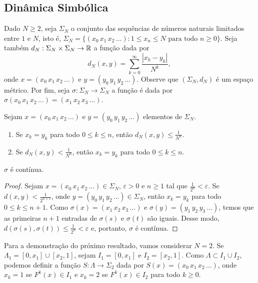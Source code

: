 \subsection{Dinâmica Simbólica}

Dado $N \geq 2$, seja $\Sigma_N$ o conjunto das sequências de números naturais limitados entre $1$ e $N$, isto é, $\Sigma_N = \lbrace (x_0 \, x_1 \, x_2 \, \dots) : 1 \leq x_n \leq N  \text{ para todo } n \geq 0 \rbrace$.
Seja também $d_N : \Sigma_N \times \Sigma_N \to \mathbb{R}$ a função dada por
$$d_N(x, y) = \sum_{k=0}^\infty \frac{|x_k - y_k|}{N^k},$$
onde $x = (x_0 \, x_1 \, x_2 \, \dots)$ e $y = (y_0 \, y_1 \, y_2 \, \dots)$.
Observe que $(\Sigma_N, d_N)$ é um espaço métrico.
Por fim, seja $\sigma: \Sigma_N \to \Sigma_N$ a função é dada por $\sigma(x_0 \, x_1 \, x_2 \, \dots) = (x_1 \, x_2 \, x_3 \, \dots)$.

\begin{proposition}
Sejam $x = (x_0 \, x_1 \, x_2 \, \dots)$ e $y = (y_0 \, y_1 \, y_2 \, \dots)$ elementos de $\Sigma_N$.
\begin{enumerate}
\item Se $x_k = y_k$ para todo $0 \leq k \leq n$, então $d_N(x, y) \leq \frac{1}{N^n}$.
\item Se $d_N(x, y) < \frac{1}{N^n}$, então $x_k = y_k$ para todo $0 \leq k \leq n$.
\end{enumerate}
\end{proposition}

\begin{proposition}
$\sigma$ é contínua.
\end{proposition}

\begin{proof}
Sejam $x = (x_0 \, x_1 \, x_2 \, \dots) \in \Sigma_N$, $\varepsilon > 0$ e $n \geq 1$ tal que $\frac{1}{2^n} < \varepsilon$.
Se $d(x, y) < \frac{1}{2^{n+1}}$, onde $y = (y_0 \, y_1 \, y_2 \, \dots) \in \Sigma_N$, então $x_k = y_k$ para todo $0 \leq k \leq n+1$.
Como $\sigma(x) = (x_1 \, x_2 \, x_3  \, \dots)$ e $\sigma(y) = (y_1 \, y_2 \, y_3 \, \dots)$, temos que as primeiras $n+1$ entradas de $\sigma(s)$ e $\sigma(t)$ são iguais. Desse modo,  $d(\sigma(s), \sigma(t)) \leq \frac{1}{2^n} < \varepsilon$ e, portanto, $\sigma$ é contínua.
\end{proof}

Para a demonstração do próximo resultado, vamos considerar $N = 2$.
Se $\Lambda_1 = [0, x_1] \cup [x_2, 1]$, sejam $I_1 = [0, x_1]$ e $I_2 = [x_2, 1]$.
Como $\Lambda \subset I_1 \cup I_2$, podemos definir a função $S: \Lambda \to \Sigma_2$ dada por $S(x) = (x_0 \, x_1 \, x_2 \, \dots)$, onde $x_k = 1$ se $F^k(x) \in I_1$ e $x_k = 2$ se $F^k(x) \in I_2$ para todo $k \geq 0$.

